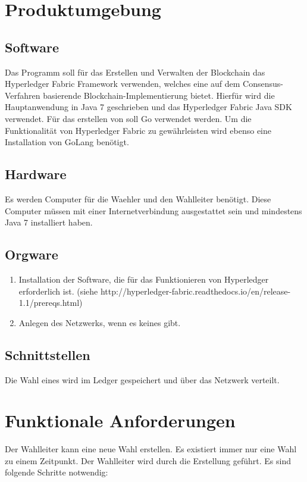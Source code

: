 \documentclass[parskip=full,11pt,twoside]{scrartcl}
\begin{document}
\section{Produktumgebung}

\subsection{Software}
Das Programm soll für das Erstellen und Verwalten der \gls{Blockchain} das Hyperledger Fabric Framework verwenden, welches eine auf dem Consensus-Verfahren basierende Blockchain-Implementierung bietet.
Hierfür wird die Hauptanwendung in Java 7 geschrieben und das Hyperledger Fabric Java SDK verwendet. Für das erstellen von  soll Go verwendet werden.
Um die Funktionalität von Hyperledger Fabric zu gewährleisten wird ebenso eine Installation von GoLang benötigt.

\subsection{Hardware}
Es werden Computer für die \gls{Waehler} und den \gls{Wahlleiter} benötigt. Diese Computer müssen mit einer Internetverbindung ausgestattet sein und mindestens Java 7 installiert haben.

\subsection{Orgware}
\begin{enumerate}
\item Installation der Software, die für das Funktionieren von Hyperledger erforderlich ist. (siehe http://hyperledger-fabric.readthedocs.io/en/release-1.1/prereqs.html)
\item Anlegen des Netzwerks, wenn es keines gibt.
\end{enumerate}

\subsection{Schnittstellen}
Die \gls{Wahl} eines  wird im \gls{Ledger} gespeichert und über das Netzwerk verteilt.

\section{Funktionale Anforderungen}

Der \gls{Wahlleiter} kann eine neue \gls{Wahl} erstellen. Es existiert immer nur eine \gls{Wahl} zu einem Zeitpunkt.
Der \gls{Wahlleiter} wird durch die Erstellung geführt. Es sind folgende Schritte notwendig:
\end{document}
